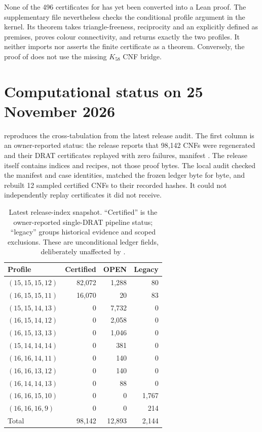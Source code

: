 \documentclass[11pt]{article}
\theoremstyle{definition}
\theoremstyle{remark}
\begin{document}
None of the 496 certificates for  has yet been converted into
a Lean proof.  The supplementary file
 nevertheless checks the conditional
profile argument in the kernel.  Its theorem
 takes triangle-freeness, reciprocity
and an explicitly defined  as premises, proves
colour connectivity, and returns exactly the two profiles.  It neither imports
nor asserts the finite certificate as a theorem.  Conversely, the proof of
 does not use the missing $K_{58}$ CNF bridge.

\section{Computational status on 25 November 2026}\label{sec:status}

 reproduces the cross-tabulation from the latest release audit.
The first column is an owner-reported status: the release reports that 98,142
CNFs were regenerated and their DRAT certificates replayed with zero failures,
manifest
.
The release itself contains indices and recipes, not those proof bytes.  The
local audit checked the manifest and case identities, matched the frozen
ledger byte for byte, and rebuilt 12 sampled certified CNFs to their recorded
hashes.  It could not independently replay certificates it did not receive.

\begin{table}[htbp]
\centering
\caption{Latest release-index snapshot.  ``Certified'' is the owner-reported
single-DRAT pipeline status; ``legacy'' groups historical evidence and scoped
exclusions.  These are unconditional ledger fields, deliberately unaffected by
.}
\label{tab:ledger}
\begin{tabular}{lrrr}
\toprule
Profile & Certified & OPEN & Legacy\\
\midrule
$(15,15,15,12)$ & 82,072 & 1,288 & 80\\
$(16,15,15,11)$ & 16,070 & 20 & 83\\
$(15,15,14,13)$ & 0 & 7,732 & 0\\
$(16,15,14,12)$ & 0 & 2,058 & 0\\
$(16,15,13,13)$ & 0 & 1,046 & 0\\
$(15,14,14,14)$ & 0 & 381 & 0\\
$(16,16,14,11)$ & 0 & 140 & 0\\
$(16,16,13,12)$ & 0 & 140 & 0\\
$(16,14,14,13)$ & 0 & 88 & 0\\
$(16,16,15,10)$ & 0 & 0 & 1,767\\
$(16,16,16,9)$ & 0 & 0 & 214\\
\midrule
Total & 98,142 & 12,893 & 2,144\\
\bottomrule
\end{tabular}
\end{table}
\end{document}

